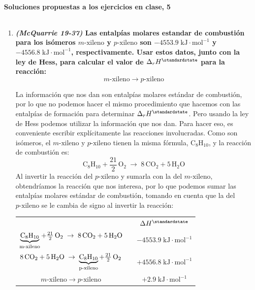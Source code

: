\documentclass[a4paper,12pt]{article}
\begin{document}

\begin{center}
\HRule \\[0.4cm]
{ \bfseries Soluciones propuestas a los ejercicios en clase, 5}\\ %
\HRule \\[0.4cm]
\end{center}


\begin{enumerate}

 \item \textbf{\textit{(McQuarrie 19-37)} Las entalp\'ias molares estandar de combusti\'on para los is\'omeros $m\mbox{-xileno}$ y $p\mbox{-xileno}$ son $-4553.9\;\mbox{kJ}\cdot\mbox{mol}^{-1}$ y $-4556.8\;\mbox{kJ}\cdot\mbox{mol}^{-1}$, respectivamente. Usar estos datos, junto con la ley de Hess, para calcular el valor de $\Delta_rH^\standardstate$ para la reacci\'on:}
$$m\mbox{-xileno}\rightarrow p\mbox{-xileno}$$ %

La informaci\'on que nos dan son entalp\'ias molares est\'andar de combusti\'on, por lo que no podemos hacer el mismo procedimiento que hacemos con las entalp\'ias de formaci\'on para determinar $\Delta_rH^\standardstate$. Pero usando la ley de Hess podemos utilizar la informaci\'on que nos dan. Para hacer eso, es conveniente escribir expl\'icitamente las reacciones involucradas. Como son is\'omeros, el $m\mbox{-xileno}$ y $p\mbox{-xileno}$ tienen la misma f\'ormula, $\mbox{C}_8\mbox{H}_{10}$, y la reacci\'on de combusti\'on es:
$$\mbox{C}_8\mbox{H}_{10}+\frac{21}{2}\,\mbox{O}_2\;\rightarrow\; 8\,\mbox{CO}_2+5\,\mbox{H}_2\mbox{O}$$
Al invertir la reacci\'on del $p\mbox{-xileno}$ y sumarla con la del $m\mbox{-xileno}$, obtendr\'iamos la reacci\'on que nos interesa, por lo que podemos sumar las entalp\'ias molares est\'andar de combusti\'on, tomando en cuenta que la del $p\mbox{-xileno}$ se le cambia de signo al invertir la reacci\'on:
\begin{center}
\begin{tabular}{c c | c}
& \quad & $\Delta H^\standardstate$ \\
$\underbrace{\mbox{C}_8\mbox{H}_{10}}_\text{m\mbox{-xileno}}+\frac{21}{2}\,\mbox{O}_2\;\rightarrow\; 8\,\mbox{CO}_2+5\,\mbox{H}_2\mbox{O}$ & \quad & $-4553.9\;\mbox{kJ}\cdot\mbox{mol}^{-1}$ \\
$8\,\mbox{CO}_2+5\,\mbox{H}_2\mbox{O}\;\rightarrow\;\underbrace{\mbox{C}_8\mbox{H}_{10}}_\text{p\mbox{-xileno}}+\frac{21}{2}\,\mbox{O}_2$ & \quad & $+4556.8\;\mbox{kJ}\cdot\mbox{mol}^{-1}$ \\ \hline
$m\mbox{-xileno}\rightarrow p\mbox{-xileno}$ & \quad & $+2.9\;\mbox{kJ}\cdot\mbox{mol}^{-1}$
\end{tabular}
\end{center}


\end{enumerate}
\end{document}
